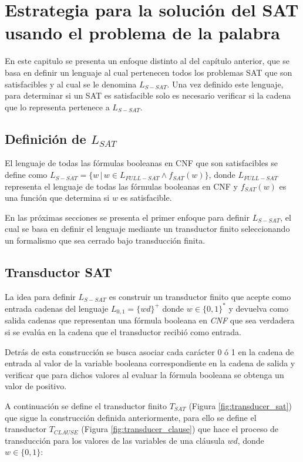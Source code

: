 \chapter{Estrategia para la solución del SAT usando el problema de la palabra}

En este capitulo se presenta un enfoque distinto al del capítulo anterior, que se basa en definir un lenguaje al cual
pertenecen todos los problemas SAT que son satisfacibles y al cual se le denomina $L_{S-SAT}$. Una vez definido este lenguaje, para determinar
si un SAT es satisfacible solo es necesario verificar si la cadena que lo representa pertenece a $L_{S-SAT}$.

\section{Definición de $L_{SAT}$}

El lenguaje de todas las fórmulas booleanas en CNF que son satisfacibles se define como $L_{S-SAT}=\{w\,|\,w \in L_{FULL-SAT} \wedge f_{SAT}(w)\}$,
donde $L_{FULL-SAT}$ representa el lenguaje de todas las fórmulas booleanas en CNF y $f_{SAT}(w)$ es una función que
determina si $w$ es satisfacible.

En las próximas secciones se presenta el primer enfoque para definir $L_{S-SAT}$, el cual se basa en definir
el lenguaje mediante un transductor finito seleccionando un formalismo que sea cerrado bajo transducción finita.
\section{Transductor SAT}

La idea para definir $L_{S-SAT}$ es construir un transductor finito que acepte como entrada cadenas del lenguaje $L_{0,1}=\{wd\}^+$ donde $w\in \{0,1\}^*$
y devuelva como salida cadenas que representan una fórmula booleana en \textit{CNF} que sea verdadera si se evalúa en la cadena que el transductor recibió como entrada.

Detrás de esta construcción se busca asociar cada carácter 0 ó 1 en la cadena de entrada al valor de la variable booleana correspondiente
en la cadena de salida y verificar que para dichos valores al evaluar la fórmula booleana se obtenga un valor de
positivo.

A continuación se define el transductor finito $T_{SAT}$ (Figura \ref{fig:transducer_sat}) que sigue la construcción definida anteriormente,
para ello se define el transductor $T_{CLAUSE}$ (Figura \ref{fig:transducer_clause}) que hace el proceso de transducción
para los valores de las variables de una cláusula $wd$, donde $w\in \{0,1\}$:

